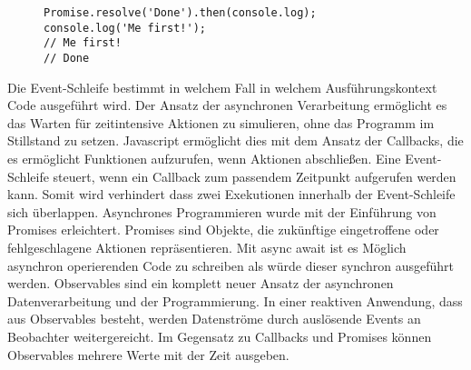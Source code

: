 \begin{figure}[H]
\begin{lstlisting}[basicstyle=\small]
Promise.resolve('Done').then(console.log);
console.log('Me first!');
// Me first!
// Done
\end{lstlisting}
\end{figure}

\noindent
Die Event-Schleife bestimmt in welchem Fall in welchem Ausführungskontext Code ausgeführt wird. Der Ansatz der asynchronen Verarbeitung ermöglicht es das Warten für zeitintensive Aktionen zu simulieren, ohne das Programm im Stillstand zu setzen. Javascript ermöglicht dies mit dem Ansatz der Callbacks, die es ermöglicht Funktionen aufzurufen, wenn Aktionen abschließen. Eine Event-Schleife steuert, wenn ein Callback zum passendem Zeitpunkt aufgerufen werden kann. Somit wird verhindert dass zwei Exekutionen innerhalb der Event-Schleife sich überlappen. Asynchrones Programmieren wurde mit der Einführung von Promises erleichtert. Promises sind Objekte, die zukünftige eingetroffene oder fehlgeschlagene Aktionen repräsentieren. Mit async await ist es Möglich asynchron operierenden Code zu schreiben als würde dieser synchron ausgeführt werden. Observables sind ein komplett neuer Ansatz der asynchronen Datenverarbeitung und der Programmierung. In einer reaktiven Anwendung, dass aus Observables besteht, werden Datenströme durch auslösende Events an Beobachter weitergereicht. Im Gegensatz zu Callbacks und Promises können Observables mehrere Werte mit der Zeit ausgeben.